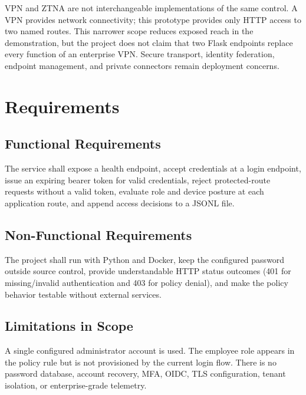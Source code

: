 \documentclass[conference]{IEEEtran}
\begin{document}
VPN and ZTNA are not interchangeable implementations of the same control. A VPN provides network connectivity; this prototype provides only HTTP access to two named routes. This narrower scope reduces exposed reach in the demonstration, but the project does not claim that two Flask endpoints replace every function of an enterprise VPN. Secure transport, identity federation, endpoint management, and private connectors remain deployment concerns.

\section{Requirements}
\subsection{Functional Requirements}
The service shall expose a health endpoint, accept credentials at a login endpoint, issue an expiring bearer token for valid credentials, reject protected-route requests without a valid token, evaluate role and device posture at each application route, and append access decisions to a JSONL file.
\subsection{Non-Functional Requirements}
The project shall run with Python and Docker, keep the configured password outside source control, provide understandable HTTP status outcomes (401 for missing/invalid authentication and 403 for policy denial), and make the policy behavior testable without external services.
\subsection{Limitations in Scope}
A single configured administrator account is used. The employee role appears in the policy rule but is not provisioned by the current login flow. There is no password database, account recovery, MFA, OIDC, TLS configuration, tenant isolation, or enterprise-grade telemetry.
\end{document}
